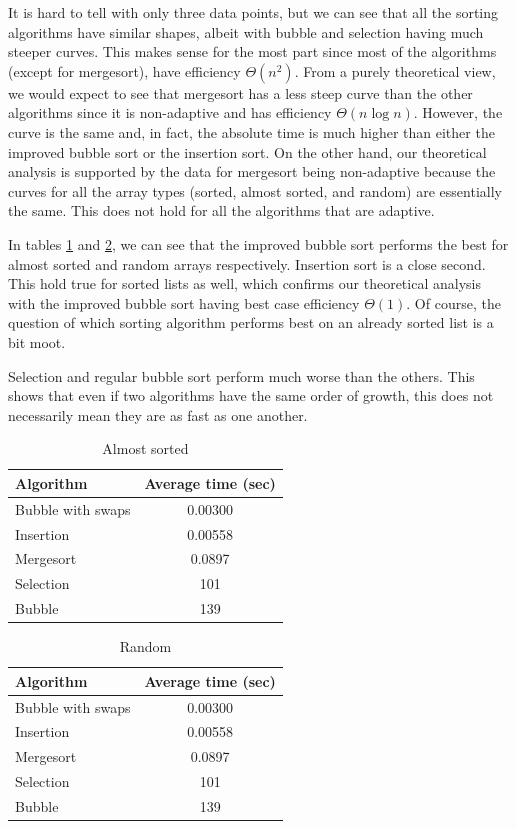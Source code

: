 \documentclass[letterpaper, 11pt]{article}
\begin{document}
It is hard to tell with only three data points, but we can see that all the
sorting algorithms have similar shapes, albeit with bubble and selection having
much steeper curves. This makes sense for the most part since most of the
algorithms (except for mergesort), have efficiency \(\Theta(n^2)\). From a
purely theoretical view, we would expect to see that mergesort has a less steep
curve than the other algorithms since it is non-adaptive and has efficiency
\(\Theta(n \log n)\). However, the curve is the same and, in fact, the absolute
time is much higher than either the improved bubble sort or the insertion sort.
On the other hand, our theoretical analysis is supported by the data for
mergesort being non-adaptive because the curves for all the array types
(sorted, almost sorted, and random) are essentially the same. This does not
hold for all the algorithms that are adaptive.  

In tables \ref{table:almost} and \ref{table:random}, we can see that the
improved bubble sort performs the best for almost sorted and random arrays
respectively. Insertion sort is a close second. This hold true for sorted lists
as well, which confirms our theoretical analysis with the improved bubble sort
having best case efficiency \(\Theta(1)\). Of course, the question of which
sorting algorithm performs best on an already sorted list is a bit moot.  

Selection and regular bubble sort perform much worse than the others. This
shows that even if two algorithms have the same order of growth, this does not
necessarily mean they are as fast as one another. 

\begin{table}[h]
\centering
  \begin{tabular}{l c}
    Algorithm & Average time (sec) \\
    \hline
    Bubble with swaps &  0.00300\\
    Insertion        &   0.00558\\
    Mergesort       &    0.0897\\
    Selection      &  101\\
    Bubble         &  139\\
  \end{tabular}
  \caption{Almost sorted}
  \label{table:almost}
\end{table}

\begin{table}[h]
\centering
  \begin{tabular}{l c}
    Algorithm & Average time (sec) \\
    \hline
		Bubble with swaps   & 0.00300\\
		Insertion           & 0.00558\\
		Mergesort           & 0.0897 \\
		Selection           & 101\\
		Bubble              & 139\\
  \end{tabular}
  \caption{Random}
  \label{table:random}
\end{table}
\end{document}
